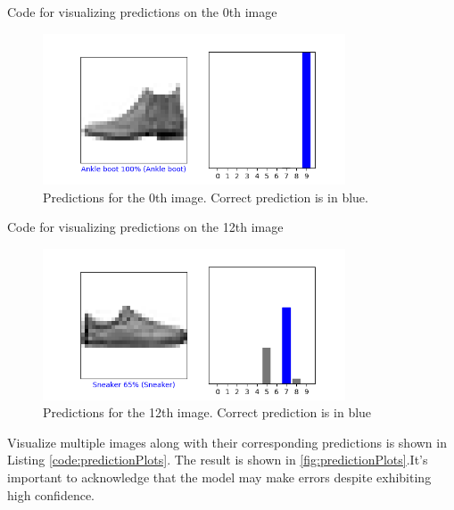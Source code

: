 \begin{code}[h!]
	    
	
	\caption{Code for visualizing predictions on the 0th image}
	\label{code:predictionPlotZero}
\end{code}

\begin{figure}[h!]
	\centering
	\includegraphics[width=0.8\textwidth]{Images/TensorFlowPackage/predictionPlotZero}
	\caption{Predictions for the 0th image. Correct prediction is in blue.} \label{fig:predictionPlotZero}
\end{figure}

\begin{code}[h!]
	    
	
	\caption{Code for visualizing predictions on the 12th image}
	\label{code:PredictionsZeroTwelve}
\end{code}

\begin{figure}[h!]
	\centering
	\includegraphics[width=0.8\textwidth]{Images/TensorFlowPackage/predictionPlotTwelve}
	\caption{Predictions for the 12th image. Correct prediction is in blue} \label{fig:PredictionsZeroTwelve}
\end{figure}

Visualize multiple images along with their corresponding predictions is shown in Listing \ref{code:predictionPlots}. The result is shown in \ref{fig:predictionPlots}.It's important to acknowledge that the model may make errors despite exhibiting high confidence.


